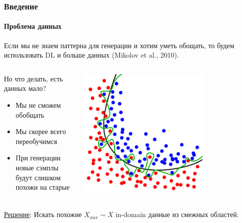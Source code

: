 \documentclass[10pt]{beamer}
\begin{document}
\begin{frame}
\frametitle{Введение}
\framesubtitle{Проблема данных}

Если мы не знаем паттерна для генерации и хотим уметь обощать, то будем использовать DL и больше данных (Mikolov et al., 2010). \\

\begin{columns}
    \begin{column}{0.5\textwidth}
        Но что делать, есть данных мало?
        \begin{itemize}
            \item Мы не сможем обобщать 
            \item Мы скорее всего переобучимся
            \item При генерации новые сэмплы будут слишком похожи на старые
        \end{itemize}
    \end{column}
    \begin{column}{0.5\textwidth}
        \begin{center}
            \includegraphics[width=0.7\textwidth]{images/overfitting.png}
        \end{center}
    \end{column}
\end{columns}

\vskip4mm

\underline{Решение}: Искать похожие $X_{aux} \sim X$ in-domain данные из смежных областей.

\end{frame}
\end{document}
